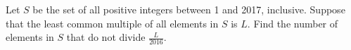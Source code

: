 Let $S$ be the set of all positive integers between 1 and 2017, inclusive. Suppose that the least common multiple of all elements in $S$ is $L$. Find the number of elements in $S$ that do not divide $\frac{L}{2016}$.
